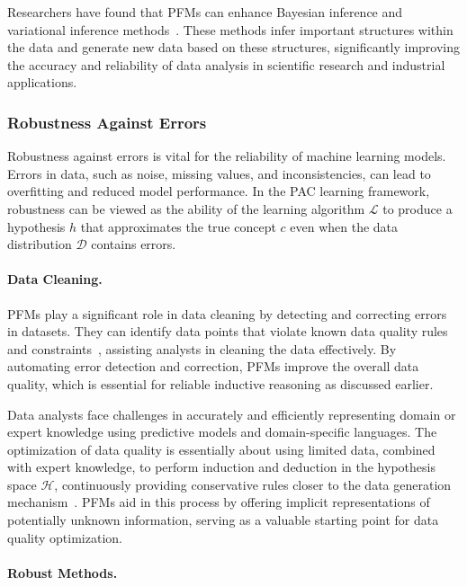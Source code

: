 Researchers have found that PFMs can enhance Bay\-esian inference and variational inference methods~\cite{huamortizing}. These methods infer important structures within the data and generate new data based on these structures, significantly improving the accuracy and reliability of data analysis in scientific research and industrial applications.

\subsubsection{Robustness Against Errors}

Robustness against errors is vital for the reliability of machine learning models. Errors in data, such as noise, missing values, and inconsistencies, can lead to overfitting and reduced model performance. In the PAC learning framework, robustness can be viewed as the ability of the learning algorithm $\mathcal{L}$ to produce a hypothesis $h$ that approximates the true concept $c$ even when the data distribution $\mathcal{D}$ contains errors.

\paragraph{Data Cleaning.}

PFMs play a significant role in data cleaning by detecting and correcting errors in datasets. They can identify data points that violate known data quality rules and constraints~\cite{li2024towards}, assisting analysts in cleaning the data effectively. By automating error detection and correction, PFMs improve the overall data quality, which is essential for reliable inductive reasoning as discussed earlier.

Data analysts face challenges in accurately and efficiently representing domain or expert knowledge using predictive models and domain-specific languages. The optimization of data quality is essentially about using limited data, combined with expert knowledge, to perform induction and deduction in the hypothesis space $\mathcal{H}$, continuously providing conservative rules closer to the data generation mechanism~\cite{peng2022self}. PFMs aid in this process by offering implicit representations of potentially unknown information, serving as a valuable starting point for data quality optimization.

\paragraph{Robust Methods.}

